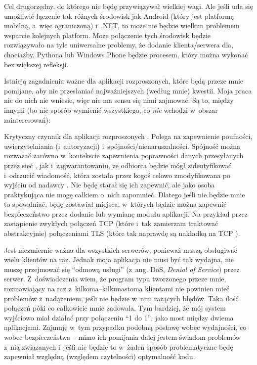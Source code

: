 \begin{description}
Cel drugorzędny, do którego nie będę przywiązywał wielkiej wagi. Ale jeśli uda się umożliwić łączenie tak różnych środowisk jak Android (który jest platformą mobilną, a~więc ograniczoną) i~.NET, to może nie będzie wielkim problemem wsparcie kolejnych platform. Może połączenie tych środowisk będzie rozwiązywało na tyle uniwersalne problemy, że dodanie klienta/serwera dla, chociażby, Pythona lub Windows Phone będzie procesem, który można wykonać bez większej refleksji. 
\end{description}

Istnieją zagadnienia ważne dla aplikacji rozproszonych, które będą przeze mnie pomijane, aby nie przesłaniać najważniejszych (według mnie) kwestii. Moja praca nic do nich nie wniesie, więc nie ma sensu się nimi zajmować. Są to, między innymi (bo nie sposób wymienić wszystkiego, co \emph{nie} wchodzi w~obszar zainteresowań):

\begin{description}
Krytyczny czynnik dla aplikacji rozproszonych \cite[str.~21]{webservices}. Polega na zapewnienie poufności, uwierzytelniania (i~autoryzacji) i~spójności/nienaruszalności. Spójność można rozważać zarówno w~kontekscie zapewnienia poprawności danych przesyłanych przez sieć \cite{dataintegrity}, jak i~zagwarantowaniu, że odbiorca będzie mógł zidentyfikować i~odrzucić wiadomość, która została przez kogoś celowo zmodyfikowana po wyjściu od nadawcy \cite{datasignature}. Nie będę starał się ich zapewnić, ale jako osoba praktykująca nie mogę całkiem o~nich zapomnieć. Dlatego jeśli nie będzie mnie to spowalniać, będę zostawiał miejsca, w~których będzie można zapewnić bezpieczeństwo przez dodanie lub wymianę modułu aplikacji. Na przykład przez zastąpienie zwykłych połączeń TCP (które i~tak zamierzam traktować abstrakcyjnie) połączeniami TLS (które tak naprawdę są nakładką na TCP \cite[str.~47]{tls}).

Jest niezmiernie ważna dla wszystkich serwerów, ponieważ muszą obsługiwać wielu klientów na raz. Jednak moja aplikacja nie musi być tak wydajna, nie muszę przejmować się ``odmową usługi'' \cite{dos}(z~ang. DoS, \emph{Denial of Service}) przez serwer. Z~doświadczenia wiem, że program typu tworzonego przeze mnie, rozmawiający na raz z~kilkoma--kilkunastoma klientami nie powinien mieć problemów z~nadążeniem, jeśli nie będzie w~nim rażących błędów. Taka ilość połączeń póki co całkowicie mnie zadowala. Tym bardziej, że mój system wyjściowo miał działać przy połączeniu ``1 do 1'', jako most między dwiema aplikacjami. Zajmuję w~tym przypadku podobną postawę wobec wydajności, co wobec bezpieczeństwa -- mimo ich pomijania dalej jestem świadom problemów z~nią związanych i~jeśli nie będzie to w~żaden sposób problematyczne będę zapewniał względną (względem czytelności) optymalność kodu.
\end{description}

